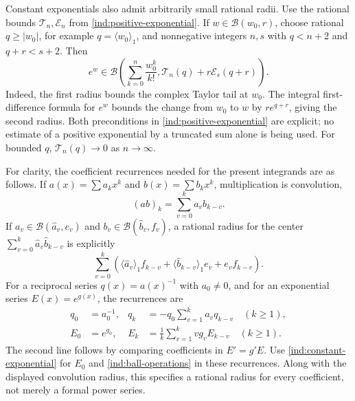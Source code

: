 Constant exponentials also admit arbitrarily small rational radii.
Use the rational bounds $\mathcal T_n,\mathcal E_n$ from
\eqref{ind:positive-exponential}.  If
$w\in\mathcal B(w_0,r)$, choose rational $q\ge|w_0|$, for example
$q=\langle w_0\rangle_1$, and nonnegative integers $n,s$
with $q<n+2$ and $q+r<s+2$.  Then
\begin{equation}\label{ind:constant-exponential}
 e^w\in\mathcal B\left(\sum_{k=0}^n\frac{w_0^k}{k!},
       \mathcal T_n(q)+r\mathcal E_s(q+r)\right).
\end{equation}
Indeed, the first radius bounds the complex Taylor tail at $w_0$.
The integral first-difference formula for $e^w$ bounds the change from
$w_0$ to $w$ by $r e^{q+r}$, giving the second radius.  Both preconditions
in \eqref{ind:positive-exponential} are explicit; no estimate of a positive
exponential by a truncated sum alone is being used.  For bounded $q$,
$\mathcal T_n(q)\to0$ as $n\to\infty$.

For clarity, the coefficient recurrences needed for the present integrands
are as follows.  If $a(x)=\sum a_kx^k$ and $b(x)=\sum b_kx^k$, multiplication
is convolution,
\begin{equation}\label{ind:convolution}
 (ab)_k=\sum_{v=0}^k a_v b_{k-v}.
\end{equation}
If $a_v\in\mathcal B(\widehat a_v,e_v)$ and
$b_v\in\mathcal B(\widehat b_v,f_v)$, a rational radius for the center
$\sum_{v=0}^k\widehat a_v\widehat b_{k-v}$ is explicitly
\[
 \sum_{v=0}^k\left(\langle\widehat a_v\rangle_1f_{k-v}
       +\langle\widehat b_{k-v}\rangle_1e_v+e_vf_{k-v}\right).
\]
For a reciprocal series $q(x)=a(x)^{-1}$ with $a_0\ne0$, and for an
exponential series $E(x)=e^{g(x)}$, the recurrences are
\begin{align}\label{ind:reciprocal-exponential-recurrences}
 q_0&=a_0^{-1},&
 q_k&=-q_0\sum_{v=1}^k a_vq_{k-v}\quad(k\ge1),\nonumber\\
 E_0&=e^{g_0},&
 E_k&=\frac1k\sum_{v=1}^k v g_v E_{k-v}\quad(k\ge1).
\end{align}
The second line follows by comparing coefficients in $E'=g'E$.
Use \eqref{ind:constant-exponential} for $E_0$ and
\eqref{ind:ball-operations} in these recurrences.  Along with the displayed
convolution radius, this specifies a rational radius for every coefficient,
not merely a formal power series.

